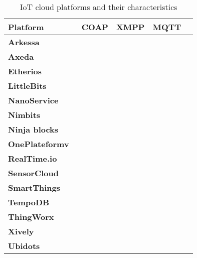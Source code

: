 \begin{table}[h!]
\scriptsize
	\begin{tabulary}{\textwidth}{L|C|C|C|C}
	\bf{Platform}      & \ \bf{COAP} & \bf{XMPP} & \bf{MQTT}\\\hline
	\bf{Arkessa}       &             &           & \ok      \\\hline
	\bf{Axeda}         &             &           &          \\\hline
	\bf{Etherios}      &             &           &          \\\hline
	\bf{LittleBits}    &             &           &          \\\hline
	\bf{NanoService}   & \ok         &           &          \\\hline
	\bf{Nimbits}       &             & \ok       &          \\\hline
	\bf{Ninja blocks}  &             &           &          \\\hline
	\bf{OnePlateformv} & \ok         & \ok       &          \\\hline
	\bf{RealTime.io}   &             &           &          \\\hline
	\bf{SensorCloud}   &             &           &          \\\hline
	\bf{SmartThings}   &             &           &          \\\hline
	\bf{TempoDB}       &             &           &          \\\hline
	\bf{ThingWorx}     &             &           & \ok      \\\hline
	\bf{Xively}        &             &           & \ok      \\\hline
	\bf{Ubidots}       &             &           & \ok      \\\hline
	\end{tabulary}
	\caption{\label{tab:IoTPlatforms} IoT cloud platforms and their characteristics}
\end{table}


